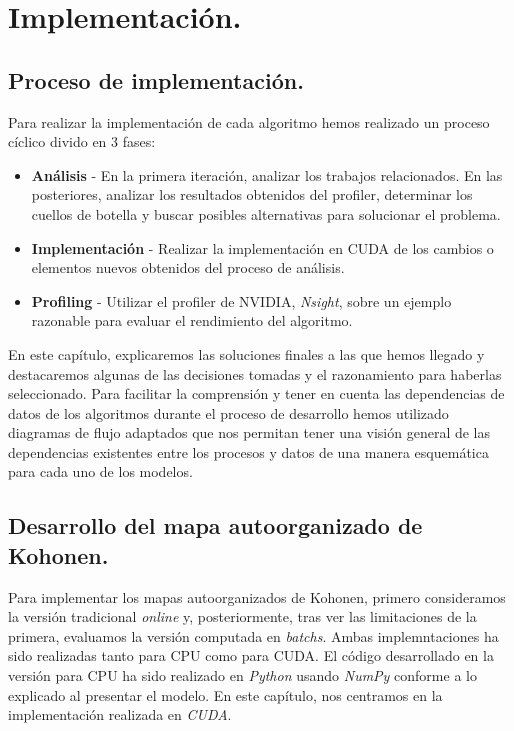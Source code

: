 \chapter{Implementación.}

\section{Proceso de implementación.}
Para realizar la implementación de cada algoritmo hemos realizado un proceso cíclico divido en 3 fases:

\begin{itemize}
	\item \textbf{Análisis} - En la primera iteración, analizar los trabajos relacionados. En las posteriores, analizar los resultados obtenidos del profiler, determinar los cuellos de botella y buscar posibles alternativas para solucionar el problema.
	\item \textbf{Implementación} - Realizar la implementación en CUDA de los cambios o elementos nuevos obtenidos del proceso de análisis.
	\item \textbf{Profiling} - Utilizar el profiler de NVIDIA, \textit{Nsight}, sobre un ejemplo razonable para evaluar el rendimiento del algoritmo.
\end{itemize}

En este capítulo, explicaremos las soluciones finales a las que hemos llegado y destacaremos algunas de las decisiones tomadas y el razonamiento para haberlas seleccionado. Para facilitar la comprensión y tener en cuenta las dependencias de datos de los algoritmos durante el proceso de desarrollo hemos utilizado diagramas de flujo adaptados que nos permitan tener una visión general de las dependencias existentes entre los procesos y datos de una manera esquemática para cada uno de los modelos. 

\section{Desarrollo del mapa autoorganizado de Kohonen.}
Para implementar los mapas autoorganizados de Kohonen, primero consideramos la versión tradicional \textit{online} y, posteriormente, tras ver las limitaciones de la primera, evaluamos la versión computada en \textit{batchs}. Ambas implemntaciones ha sido realizadas tanto para CPU como para CUDA. El código desarrollado en la versión para CPU ha sido realizado en \textit{Python} usando \textit{NumPy} conforme a lo explicado al presentar el modelo. En este capítulo, nos centramos en la implementación realizada en \textit{CUDA}.


